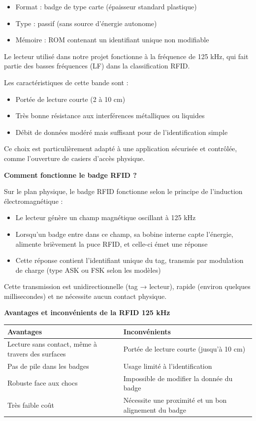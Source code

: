 \documentclass[main.tex]{subfiles}
\begin{document}
\begin{itemize}
\item Format : badge de type carte (épaisseur standard plastique)
\item Type : passif (sans source d’énergie autonome)
\item Mémoire : ROM contenant un identifiant unique non modifiable
\end{itemize}

Le lecteur utilisé dans notre projet fonctionne à la fréquence de 125 kHz, qui fait partie des basses fréquences (LF) dans la classification RFID.

Les caractéristiques de cette bande sont :

\begin{itemize}
\item Portée de lecture courte (2 à 10 cm)
\item Très bonne résistance aux interférences métalliques ou liquides
\item Débit de données modéré mais suffisant pour de l’identification simple
\end{itemize}

Ce choix est particulièrement adapté à une application sécurisée et contrôlée, comme l’ouverture de casiers d’accès physique.

\textbf{Comment fonctionne le badge RFID ?}

Sur le plan physique, le badge RFID fonctionne selon le principe de l’induction électromagnétique :

\begin{itemize}
\item Le lecteur génère un champ magnétique oscillant à 125 kHz
\item Lorsqu’un badge entre dans ce champ, sa bobine interne capte l’énergie, alimente brièvement la puce RFID, et celle-ci émet une réponse
\item Cette réponse contient l’identifiant unique du tag, transmis par modulation de charge (type ASK ou FSK selon les modèles)
\end{itemize}

Cette transmission est unidirectionnelle (tag → lecteur), rapide (environ quelques millisecondes) et ne nécessite aucun contact physique.

\textbf{Avantages et inconvénients de la RFID 125 kHz}

\begin{table}[h!]
\centering
\begin{tabular}{|p{7cm}|p{7cm}|}
\hline
\textbf{Avantages} & \textbf{Inconvénients} \\
\hline
Lecture sans contact, même à travers des surfaces & Portée de lecture courte (jusqu’à 10 cm) \\
\hline
Pas de pile dans les badges & Usage limité à l’identification \\
\hline
Robuste face aux chocs & Impossible de modifier la donnée du badge \\
\hline
Très faible coût & Nécessite une proximité et un bon alignement du badge \\
\hline
\end{tabular}
\end{table}
\end{document}
